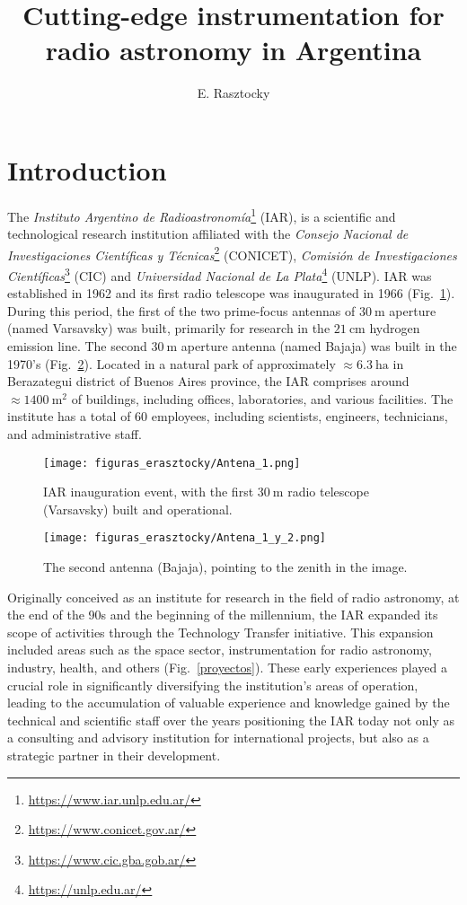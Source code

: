 \documentclass[baaa]{baaa}
\title{Cutting-edge instrumentation for radio astronomy in Argentina}
\author{
E. Rasztocky\inst{1}}
\institute{Instituto Argentino de Radioastronom\'ia, CONICET--CICPBA--UNLP, Argentina}
\begin{document}
\maketitle
\section{Introduction}\label{S_intro}


The \textit{Instituto Argentino de Radioastronomía}\footnote{\url{https://www.iar.unlp.edu.ar/}}  (IAR), is a scientific and technological research institution  affiliated with the \textit{Consejo Nacional de Investigaciones Científicas y Técnicas}\footnote{\url{https://www.conicet.gov.ar/}} (CONICET), \textit{Comisión de Investigaciones Científicas}\footnote{\url{https://www.cic.gba.gob.ar/}} (CIC) and \textit{Universidad Nacional de La Plata}\footnote{\url{https://unlp.edu.ar/}} (UNLP). IAR was established in 1962 and its first radio telescope was inaugurated in 1966 (Fig.~\ref{Inauguracion}). During this period, the first of the two prime-focus antennas of $30~\mathrm{m}$ aperture (named Varsavsky) was built, primarily for research in the $21~\mathrm{cm}$ hydrogen emission line. The second $30~\mathrm{m}$ aperture antenna (named Bajaja) was built in the 1970's (Fig.~\ref{dos_antenas}). Located in a natural park of approximately $\approx6.3~\mathrm{ha}$ in Berazategui district of Buenos Aires province, the IAR comprises around $\approx1400~\mathrm{m^2}$ of buildings, including offices, laboratories, and various facilities. The institute has a total of 60 employees, including scientists, engineers, technicians, and administrative staff. 


\begin{figure}[!t]
\centering
\texttt{[image: figuras\_erasztocky/Antena\_1.png]}
\caption{IAR inauguration event, with the first $30~\mathrm{m}$ radio telescope (Varsavsky) built and operational.}
\label{Inauguracion}
\end{figure}

\begin{figure}[!t]
\centering
\texttt{[image: figuras\_erasztocky/Antena\_1\_y\_2.png]}
\caption{The second antenna (Bajaja), pointing to the zenith in the image.}
\label{dos_antenas}
\end{figure}


Originally conceived as an institute for research in the field of radio astronomy, at the end of the 90s and the beginning of the millennium, the IAR expanded its scope of activities through the Technology Transfer\citep{fliger2024astrophysics} initiative. This expansion included areas such as the space sector, instrumentation for radio astronomy, industry, health, and others (Fig.~\ref{proyectos}). These early experiences played a crucial role in significantly diversifying the institution's areas of operation, leading to the accumulation of valuable experience and knowledge gained by the technical and scientific staff over the years positioning the IAR today not only as a consulting and advisory institution for international projects, but also as a strategic partner in their development.
\end{document}

